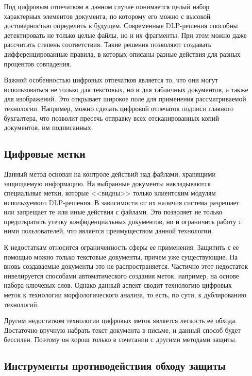 Под цифровым отпечатком в данном случае понимается целый набор характерных элементов документа, по которому его можно с высокой достоверностью определить в будущем. Современные DLP-решения способны детектировать не только целые файлы, но и их фрагменты. При этом можно даже рассчитать степень соответствия. Такие решения позволяют создавать дифференцированные правила, в которых описаны разные действия для разных процентов совпадения.

Важной особенностью цифровых отпечатков является то, что они могут использоваться не только для текстовых, но и для табличных документов, а также для изображений. Это открывает широкое поле для применения рассматриваемой технологии. Например, можно сделать цифровой отпечаток подписи главного бухгалтера, что позволит пресечь отправку всех отсканированных копий документов, им подписанных.

\subsection{Цифровые метки}

Данный метод основан на контроле действий над файлами, хранящими защищаемую информацию. На выбранные документы накладываются специальные метки, которые <<видны>> только клиентским модулям используемого DLP-решения. В зависимости от их наличия система разрешает или запрещает те или иные действия с файлами. Это позволяет не только предотвратить утечку конфиденциальных документов, но и ограничить работу с ними пользователей, что является преимуществом данной технологии.

К недостаткам относится ограниченность сферы ее применения. Защитить с ее помощью можно только текстовые документы, причем уже существующие. На вновь создаваемые документы это не распространяется. Частично этот недостаток нивелируется способами автоматического создания меток, например, на основе набора ключевых слов. Однако данный аспект сводит технологию цифровых меток к технологии морфологического анализа, то есть, по сути, к дублированию технологий.

Другим недостатком технологии цифровых меток является легкость ее обхода. Достаточно вручную набрать текст документа в письме, и данный способ будет бессилен. Поэтому он хорош только в сочетании с другими методами защиты.

\subsection{Инструменты противодействия обходу защиты}

